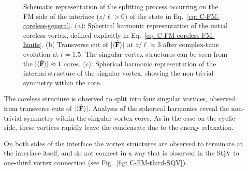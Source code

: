 \begin{figure}
    \caption{\label{fig: C-FM-coreless-FM}Schematic representation of the
        splitting process occurring on the FM side of the interface
        (\(z/\ell > 0\)) of the state in Eq.~\eqref{eq: C-FM-coreless-general}.
        (a): Spherical harmonic representation of the initial coreless vortex,
        defined explicitly in Eq.~\eqref{eq: C-FM-coreless-FM-limits}.
        (b) Transverse cut of \(|\langle \hat{\vb{F}} \rangle | \) at \(z/\ell \approx 3\) after
        complex-time evolution at \(\bar{t} = 1.5\).
        The singular vortex structures can be seen from the
        \(|\langle \hat{\vb{F}} \rangle | \approx 1\) cores.
        (c): Spherical harmonic representation of the internal structure of
        the singular vortex, showing the non-trivial symmetry within the core.}
\end{figure}
The coreless structure is observed to split into four singular vortices,
observed from transverse cuts of \(|\langle \hat{\vb{F}} \rangle | \).
Analysis of the spherical harmonics reveal the non-trivial symmetry within
the singular vortex cores.
As in the case on the cyclic side, these vortices rapidly leave the condensate
due to the energy relaxation.

On both sides of the interface the vortex structures are observed to terminate
at the interface itself, and do not connect in a way that is observed in the
SQV to one-third vortex connection (see Fig.~\ref{fig: C-FM-third-SQV}).
